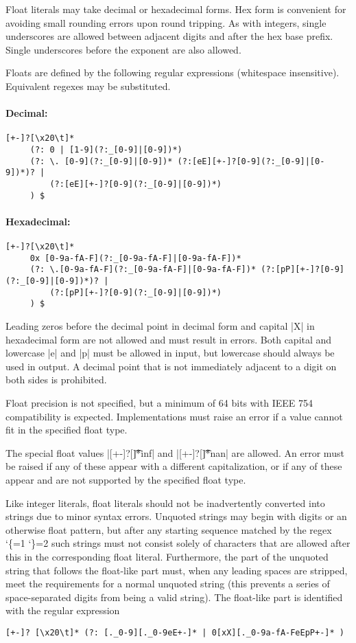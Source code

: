 \documentclass[11pt]{article}
\makeatletter
\newcommand{\lit}{%
  \begingroup
  \let\do\@makeother
  \dospecials
  \catcode`\{=1
  \catcode`\}=2
  \lit@i}
\def\lit@i#1{%
  \endgroup
  \texttt{\color{DarkRed}\detokenize{#1}}}
\makeatother
\begin{document}
Float literals may take decimal or hexadecimal forms.  Hex form is convenient for avoiding small rounding errors upon round tripping.  As with integers, single underscores are allowed between adjacent digits and after the hex base prefix.  Single underscores before the exponent are also allowed.

Floats are defined by the following regular expressions (whitespace insensitive).  Equivalent regexes may be substituted.

\paragraph{Decimal:}
\begin{Verbatim}[fontsize=\small]
[+-]?[\x20\t]*
     (?: 0 | [1-9](?:_[0-9]|[0-9])*)
     (?: \. [0-9](?:_[0-9]|[0-9])* (?:[eE][+-]?[0-9](?:_[0-9]|[0-9])*)? |
         (?:[eE][+-]?[0-9](?:_[0-9]|[0-9])*) 
     ) $
\end{Verbatim}

\paragraph{Hexadecimal:}
\begin{Verbatim}[fontsize=\small]
[+-]?[\x20\t]* 
     0x [0-9a-fA-F](?:_[0-9a-fA-F]|[0-9a-fA-F])*
     (?: \.[0-9a-fA-F](?:_[0-9a-fA-F]|[0-9a-fA-F])* (?:[pP][+-]?[0-9](?:_[0-9]|[0-9])*)? |
         (?:[pP][+-]?[0-9](?:_[0-9]|[0-9])*)
     ) $
\end{Verbatim}
Leading zeros before the decimal point in decimal form and capital |X| in hexadecimal form are not allowed and must result in errors.  Both capital and lowercase |e| and |p| must be allowed in input, but lowercase should always be used in output.  A decimal point that is not immediately adjacent to a digit on both sides is prohibited.

Float precision is not specified, but a minimum of 64 bits with IEEE 754 compatibility is expected.  Implementations must raise an error if a value cannot fit in the specified float type.

The special float values |[+-]?[\t]*inf| and |[+-]?[\t]*nan| are allowed.  An error must be raised if any of these appear with a different capitalization, or if any of these appear and are not supported by the specified float type.

Like integer literals, float literals should not be inadvertently converted into strings due to minor syntax errors.  Unquoted strings may begin with digits or an otherwise float pattern, but after any starting sequence matched by the regex \lit{[+-]?[\x20\t]*(?:[.0-9]|0[xX])} such strings must not consist solely of characters that are allowed after this in the corresponding float literal.  Furthermore, the part of the unquoted string that follows the float-like part must, when any leading spaces are stripped, meet the requirements for a normal unquoted string (this prevents a series of space-separated digits from being a valid string).  The float-like part is identified with the regular expression
\begin{Verbatim}
[+-]? [\x20\t]* (?: [._0-9][._0-9eE+-]* | 0[xX][._0-9a-fA-FeEpP+-]* )
\end{Verbatim}
\end{document}
